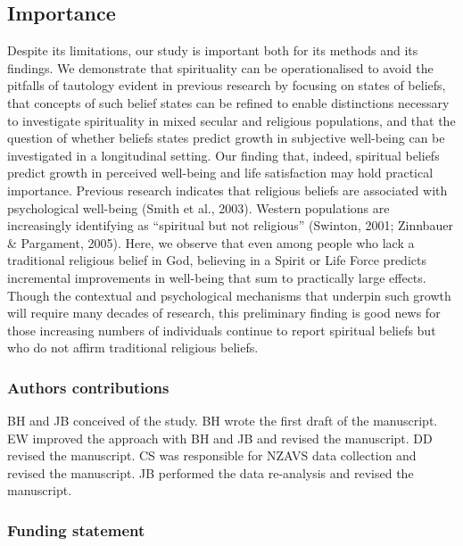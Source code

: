 \documentclass[
  english,
  man,floatsintext]{apa6}
\begin{document}
\hypertarget{importance}{%
\subsection{Importance}\label{importance}}

Despite its limitations, our study is important both for its methods and its findings. We demonstrate that spirituality can be operationalised to avoid the pitfalls of tautology evident in previous research by focusing on states of beliefs, that concepts of such belief states can be refined to enable distinctions necessary to investigate spirituality in mixed secular and religious populations, and that the question of whether beliefs states predict growth in subjective well-being can be investigated in a longitudinal setting. Our finding that, indeed, spiritual beliefs predict growth in perceived well-being and life satisfaction may hold practical importance. Previous research indicates that religious beliefs are associated with psychological well-being (Smith et al., 2003). Western populations are increasingly identifying as \enquote{spiritual but not religious} (Swinton, 2001; Zinnbauer \& Pargament, 2005). Here, we observe that even among people who lack a traditional religious belief in God, believing in a Spirit or Life Force predicts incremental improvements in well-being that sum to practically large effects. Though the contextual and psychological mechanisms that underpin such growth will require many decades of research, this preliminary finding is good news for those increasing numbers of individuals continue to report spiritual beliefs but who do not affirm traditional religious beliefs.

\hypertarget{authors-contributions}{%
\subsubsection{Authors contributions}\label{authors-contributions}}

BH and JB conceived of the study. BH wrote the first draft of the manuscript. EW improved the approach with BH and JB and revised the manuscript. DD revised the manuscript. CS was responsible for NZAVS data collection and revised the manuscript. JB performed the data re-analysis and revised the manuscript.

\hypertarget{funding-statement}{%
\subsubsection{Funding statement}\label{funding-statement}}
\end{document}
